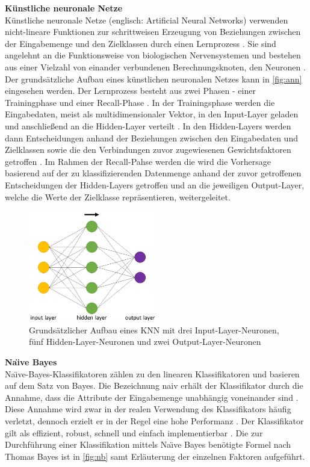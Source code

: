 \textbf{Künstliche neuronale Netze\medskip}\\
Künstliche neuronale Netze (englisch: Artificial Neural Networks) verwenden nicht-lineare Funktionen zur schrittweisen Erzeugung von Beziehungen zwischen der Eingabemenge und den Zielklassen durch einen Lernprozess \cite{Linder2004}. Sie sind angelehnt an die Funktionsweise von biologischen Nervensystemen und bestehen aus einer Vielzahl von einander verbundenen Berechnungsknoten, den Neuronen \cite{OShea2015}. Der grundsätzliche Aufbau eines künstlichen neuronalen Netzes kann in \autoref{fig:ann} eingesehen werden. Der Lernprozess besteht aus zwei Phasen - einer Trainingphase und einer Recall-Phase \cite{Linder2004}. In der Trainingsphase werden die Eingabedaten, meist als multidimensionaler Vektor, in den Input-Layer geladen und anschließend an die Hidden-Layer verteilt \cite{OShea2015}. In den Hidden-Layers werden dann Entscheidungen anhand der Beziehungen zwischen den Eingabedaten und Zielklassen sowie die den Verbindungen zuvor zugewiesenen Gewichtsfaktoren getroffen \cite{Linder2004,OShea2015}. Im Rahmen der Recall-Pahse werden die wird die Vorhersage basierend auf der zu klassifizierenden Datenmenge anhand der zuvor getroffenen Entscheidungen der Hidden-Layers getroffen und an die jeweiligen Output-Layer, welche die Werte der Zielklasse repräsentieren, weitergeleitet\cite{Linder2004}. 

\begin{figure}[t]
    \centering
    \includegraphics[width=0.5\textwidth]{images/ANN}
    \caption{Grundsätzlicher Aufbau eines KNN mit drei Input-Layer-Neuronen, fünf Hidden-Layer-Neuronen und zwei Output-Layer-Neuronen\label{fig:ann}}
\end{figure}

\textbf{Na\"{\i}ve Bayes\medskip}\\
Na\"{\i}ve-Bayes-Klassifikatoren zählen zu den linearen Klassifikatoren und basieren auf dem Satz von Bayes. Die Bezeichnung \glqq naiv\grqq{} erhält der Klassifikator durch die Annahme, dass die Attribute der Eingabemenge unabhängig voneinander sind \cite{Raschka2014}. Diese Annahme wird zwar in der realen Verwendung des Klassifikators häufig verletzt, dennoch erzielt er in der Regel eine hohe Performanz \cite{Raschka2014}. Der Klassifikator gilt als effizient, robust, schnell und einfach implementierbar \cite{Raschka2014}. Die zur Durchführung einer Klassifikation mittels Na\"{\i}ve Bayes benötigte Formel nach Thomas Bayes ist in \autoref{fig:nb} samt Erläuterung der einzelnen Faktoren aufgeführt.

